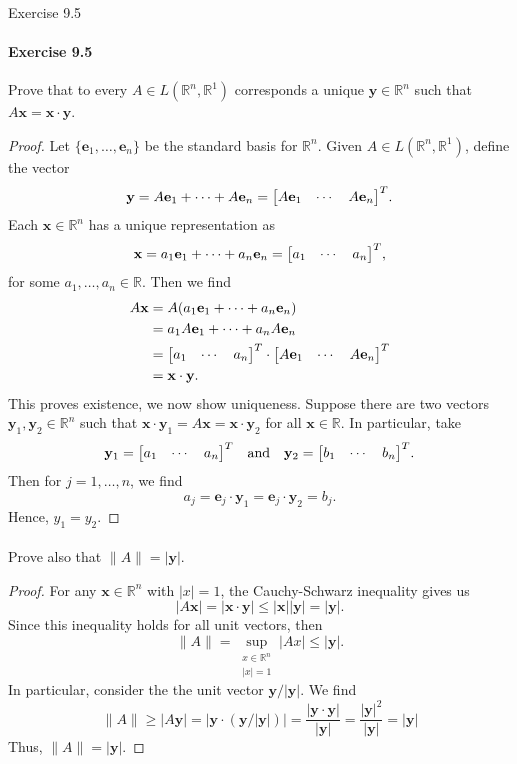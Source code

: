 \documentclass[12pt]{article}
\newenvironment{fullbox}{\begin{lrbox}{\savefullbox}\begin{minipage}{\dimexpr\textwidth-2\fboxsep\relax}}{\end{minipage}\end{lrbox}\begin{center}\framebox[\textwidth]{\usebox{\savefullbox}}\end{center}}
\newenvironment{pbox}[1][]{\begin{fullbox}\ifx#1\empty\else\paragraph{#1}\fi}{\end{fullbox}}
\theoremstyle{definition}
\newcommand{\isp}[1]{\quad\text{#1}\quad}
\newcommand{\R}{\mathbb{R}}
\newcommand{\x}{\mathbf{x}}
\newcommand{\y}{\mathbf{y}}
\newcommand{\e}{\mathbf{e}}
\begin{document}
\newpage
\begin{pbox}[Exercise 9.5]
    Prove that to every $A \in L(\R^n, \R^1)$ corresponds a unique $\y \in \R^n$ such that $A\x = \x \cdot \y$.
\end{pbox}

\begin{proof}
    Let $\{\e_1, \dots, \e_n\}$ be the standard basis for $\R^n$. Given $A \in L(\R^n, \R^1)$, define the vector
    \[
        \y = A\e_1 + \cdots + A\e_n = \mqty[A\e_1 & \cdots & A\e_n]^T.
    \]
    Each $\x \in \R^n$ has a unique representation as
    \[
        \x = a_1\e_1 + \cdots + a_n\e_n = \mqty[a_1 & \cdots & a_n]^T,
    \]
    for some $a_1, \dots, a_n \in \R$. Then we find
    \begin{align*}
        A\x &= A(a_1\e_1 + \cdots + a_n\e_n) \\
            &= a_1A\e_1 + \cdots + a_nA\e_n \\
            &= \mqty[a_1 & \cdots & a_n]^T \cdot \mqty[A\e_1 & \cdots & A\e_n]^T \\
            &= \x \cdot \y.
    \end{align*}
    This proves existence, we now show uniqueness. Suppose there are two vectors $\y_1, \y_2 \in \R^n$ such that $\x \cdot \y_1 = A\x = \x \cdot \y_2$ for all $\x \in \R$. In particular, take
    \[
        \y_1 = \mqty[a_1 & \cdots & a_n]^T
        \isp{and}
        \y_2 = \mqty[b_1 & \cdots & b_n]^T.
    \]
    Then for $j = 1, \dots, n$, we find
    \[
        a_j = \e_j \cdot \y_1 = \e_j \cdot \y_2 = b_j.
    \]
    Hence, $y_1 = y_2$.

\end{proof}


\begin{pbox}[]
    Prove also that $\|A\| = |\y|$.
\end{pbox}

\begin{proof}
    For any $\x \in \R^n$ with $|x| = 1$, the Cauchy-Schwarz inequality gives us
    \[
        |A\x| = |\x \cdot \y| \leq |\x||\y| = |\y|.
    \]
    Since this inequality holds for all unit vectors, then
    \[
        \|A\| = \sup_{\substack{x \in \R^n \\ |x| = 1}}|Ax| \leq |\y|.
    \]
    In particular, consider the the unit vector $\y/|\y|$. We find
    \[
        \|A\| 
            \geq |A\y| 
            = |\y \cdot (\y/|\y|)| 
            = \frac{|\y \cdot \y|}{|\y|}
            = \frac{|\y|^2}{|\y|}
            = |\y|
    \]
    Thus, $\|A\| = |\y|$.

\end{proof}
\end{document}
